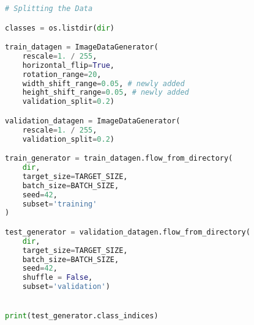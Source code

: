 \begin{lstlisting}[language=Python]
# Splitting the Data

classes = os.listdir(dir)

train_datagen = ImageDataGenerator(
    rescale=1. / 255,
    horizontal_flip=True,
    rotation_range=20,
    width_shift_range=0.05, # newly added
    height_shift_range=0.05, # newly added
    validation_split=0.2)

validation_datagen = ImageDataGenerator(
    rescale=1. / 255,
    validation_split=0.2)

train_generator = train_datagen.flow_from_directory(
    dir,
    target_size=TARGET_SIZE,
    batch_size=BATCH_SIZE,
    seed=42,
    subset='training'
)

test_generator = validation_datagen.flow_from_directory(
    dir,
    target_size=TARGET_SIZE,
    batch_size=BATCH_SIZE,
    seed=42,
    shuffle = False,
    subset='validation')


print(test_generator.class_indices)

\end{lstlisting}

